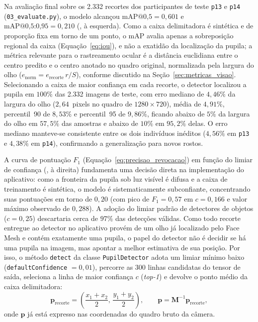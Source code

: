 Na avaliação final sobre os 2.332 recortes dos participantes de teste \texttt{p13} e \texttt{p14} (\texttt{03\_\allowbreak evaluate.py}), o modelo alcançou $\text{mAP@0,5} = 0{,}601$ e $\text{mAP@0,5:0,95} = 0{,}210$ (, à esquerda). Como a caixa delimitadora é sintética e de proporção fixa em torno de um ponto, o mAP avalia apenas a sobreposição regional da caixa (Equação~\ref{eq:iou}), e não a exatidão da localização da pupila; a métrica relevante para o rastreamento ocular é a distância euclidiana entre o centro predito e o centro anotado no quadro original, normalizada pela largura do olho ($e_{\text{norm}} = e_{\text{recorte}}\,r / S$), conforme discutido na Seção~\ref{sec:metricas_visao}. Selecionando a caixa de maior confiança em cada recorte, o detector localizou a pupila em $100\%$ das 2.332 imagens de teste, com erro mediano de $4{,}46\%$ da largura do olho ($2{,}64$~pixels no quadro de $1280 \times 720$), média de $4{,}91\%$, percentil~90 de $8{,}53\%$ e percentil~95 de $9{,}86\%$, ficando abaixo de $5\%$ da largura do olho em $57{,}5\%$ das amostras e abaixo de $10\%$ em $95{,}2\%$ delas. O erro mediano manteve-se consistente entre os dois indivíduos inéditos ($4{,}56\%$ em \texttt{p13} e $4{,}38\%$ em \texttt{p14}), confirmando a generalização para novos rostos.

A curva de pontuação $F_1$ (Equação~\ref{eq:precisao_revocacao}) em função do limiar de confiança (, à direita) fundamenta uma decisão direta na implementação do aplicativo: como a fronteira da pupila sob luz visível é difusa e a caixa de treinamento é sintética, o modelo é sistematicamente subconfiante, concentrando suas pontuações em torno de $0{,}20$ (com pico de $F_1 = 0{,}57$ em $c = 0{,}166$ e valor máximo observado de $0{,}288$). A adoção do limiar padrão de detectores de objetos ($c = 0{,}25$) descartaria cerca de $97\%$ das detecções válidas. Como todo recorte entregue ao detector no aplicativo provém de um olho já localizado pelo Face Mesh e contém exatamente uma pupila, o papel do detector não é decidir se há uma pupila na imagem, mas apontar a melhor estimativa de sua posição. Por isso, o método \texttt{detect} da classe \texttt{PupilDetector} adota um limiar mínimo baixo (\texttt{defaultConfidence} $= 0{,}01$), percorre as 300 linhas candidatas do tensor de saída, seleciona a linha de maior confiança $c$ (\textit{top-1}) e devolve o ponto médio da caixa delimitadora:
\begin{equation}
    \mathbf{p}_{\text{recorte}} = \left(\frac{x_1 + x_2}{2},\, \frac{y_1 + y_2}{2}\right), \qquad
    \mathbf{p} = \mathbf{M}^{-1}\mathbf{p}_{\text{recorte}},
    \label{eq:centro_pupila}
\end{equation}
onde $\mathbf{p}$ já está expresso nas coordenadas do quadro bruto da câmera.

